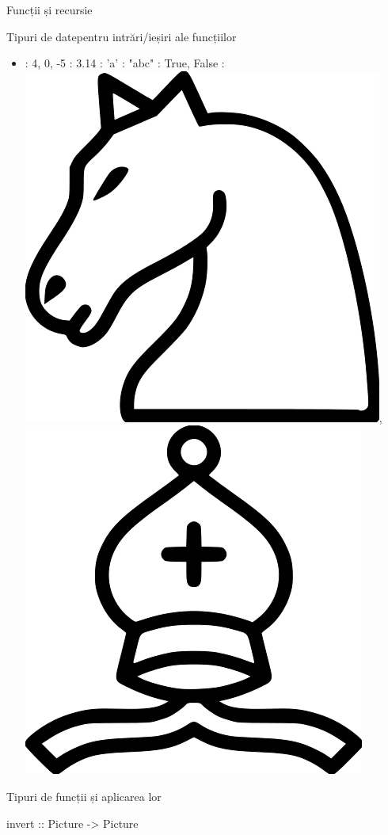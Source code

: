 \documentclass[handout,xcolor=pdftex,romanian,colorlinks]{beamer}
\begin{document}
\begin{section}{Funcții și recursie}
\begin{frame}{Tipuri de date}{pentru intrări/ieșiri ale funcțiilor}
\begin{itemize}
\item {}:  4, 0, -5
\vitem {}: 3.14
\vitem {}: 'a'
\vitem {}: "abc"
\vitem {}: True, False
 : \includegraphics[scale=.05, valign=t]{knight.png}, \includegraphics[scale=.05, valign=t]{bishop.png}
\end{itemize}
\end{frame}
\tikzset{>=latex} 
\begin{frame}[fragile]{Tipuri de funcții și aplicarea lor}
\begin{asciihs}
invert :: Picture -> Picture


\end{asciihs}
\end{frame}
\end{section}
\end{document}
